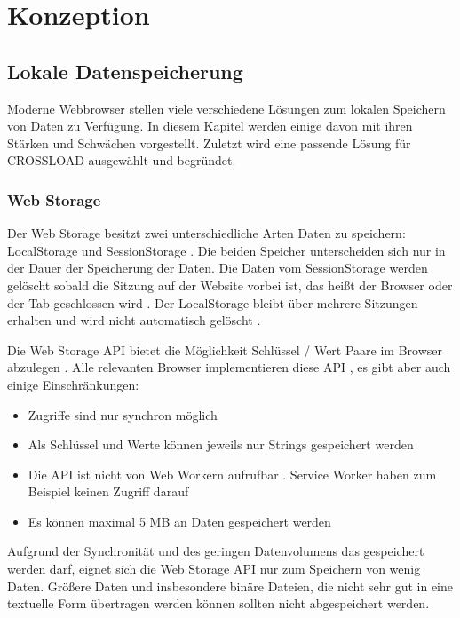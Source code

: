 \chapter{Konzeption}
\label{Kap4}

\section{Lokale Datenspeicherung}
Moderne Webbrowser stellen viele verschiedene Lösungen zum lokalen Speichern von Daten zu Verfügung. In diesem Kapitel werden einige davon mit ihren Stärken und Schwächen vorgestellt. Zuletzt wird eine passende Lösung für CROSSLOAD ausgewählt und begründet.

\subsection{Web Storage}
Der Web Storage besitzt zwei unterschiedliche Arten Daten zu speichern: LocalStorage und SessionStorage \autocite{Hajian2019} \autocite{mdn-web-storage}. Die beiden Speicher unterscheiden sich nur in der Dauer der Speicherung der Daten. Die Daten vom SessionStorage werden gelöscht sobald die Sitzung auf der Website vorbei ist, das heißt der Browser oder der Tab geschlossen wird \autocite{Hajian2019} \autocite{mdn-web-storage}. Der LocalStorage bleibt über mehrere Sitzungen erhalten und wird nicht automatisch gelöscht \autocite{Hajian2019} \autocite{mdn-web-storage}. 

Die Web Storage \ac{API} bietet die Möglichkeit Schlüssel / Wert Paare im Browser abzulegen \autocite{mdn-web-storage}. Alle relevanten Browser implementieren diese \ac{API} \autocite{mdn-web-storage}, es gibt aber auch einige Einschränkungen:

\begin{itemize}
	\item Zugriffe sind nur synchron möglich \autocite{Hajian2019}
	\item Als Schlüssel und Werte können jeweils nur Strings gespeichert werden \autocite{Hajian2019}
	\item Die \ac{API} ist nicht von Web Workern aufrufbar \autocite{Hajian2019}. Service Worker haben zum Beispiel keinen Zugriff darauf
	\item Es können maximal 5 \ac{MB} an Daten gespeichert werden \autocite{mdn-web-storage}
\end{itemize}

Aufgrund der Synchronität und des geringen Datenvolumens das gespeichert werden darf, eignet sich die Web Storage \ac{API} nur zum Speichern von wenig Daten. Größere Daten und insbesondere binäre Dateien, die nicht sehr gut in eine textuelle Form übertragen werden können sollten nicht abgespeichert werden. 

